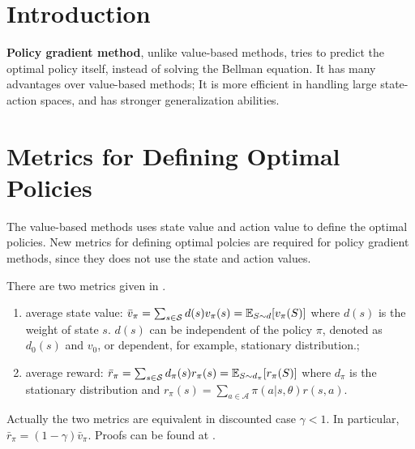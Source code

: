 \section{Introduction}
    \textbf{Policy gradient method}, unlike value-based methods, tries to predict the optimal policy itself,
    instead of solving the Bellman equation. It has many advantages over value-based methods;
    It is more efficient in handling large state-action spaces, and has stronger generalization abilities.
\section{Metrics for Defining Optimal Policies}\label{sec:Metrics}
    The value-based methods uses state value and action value to define the optimal policies.
    New metrics for defining optimal polcies are required for policy gradient methods, since they does not use the state and action values.

    There are two metrics given in \cite{Zhao2025}.
    \begin{enumerate}
        \item average state value: $\bar{v}_\pi = \sum_{s\in\mathcal{S}}d(s)v_\pi(s) = \mathbb{E}_{S \sim d}[v_\pi(S)]$ where $d(s)$ is the weight of state $s$. $d(s)$ can be independent of the policy $\pi$, denoted as $d_0(s)$ and $v_0$, or dependent, for example, stationary distribution.;
        \item average reward: $\bar{r}_\pi = \sum_{s\in\mathcal{S}}d_\pi(s)r_\pi(s) = \mathbb{E}_{S \sim d_\pi}[r_\pi(S)]$ where $d_\pi$ is the stationary distribution and $r_\pi(s) = \sum_{a \in \mathcal{A}}\pi(a|s,\theta)r(s,a)$.
    \end{enumerate}
    Actually the two metrics are equivalent in discounted case $\gamma < 1$. In particular, $\bar{r}_\pi = (1-\gamma)\bar{v}_\pi$. Proofs can be found at \cite{Zhao2025}.

